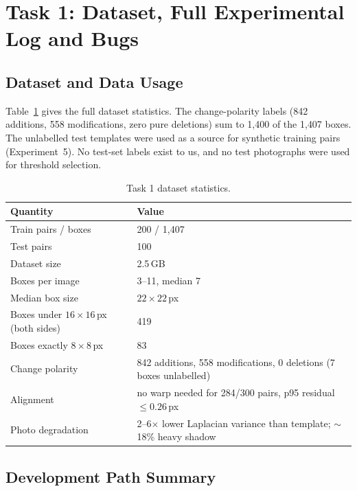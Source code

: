 \section{Task 1: Dataset, Full Experimental Log and Bugs}
\label{app:t1}
\renewcommand{\expprefix}{A}

\subsection{Dataset and Data Usage}

Table~\ref{tab:t1-dataset} gives the full dataset statistics. The change-polarity
labels (842 additions, 558 modifications, zero pure deletions) sum to 1{,}400 of the
1{,}407 boxes.
The unlabelled test templates were used as a source for synthetic training pairs
(Experiment~5). No test-set labels exist to us, and no test photographs were used for
threshold selection.

\begin{table}[h]
\caption{Task 1 dataset statistics.}\label{tab:t1-dataset}
\centering
\small
\begin{tabular}{lp{6.2cm}}
\toprule
Quantity & Value \\
\midrule
Train pairs / boxes & 200 / 1{,}407 \\
Test pairs & 100 \\
Dataset size & 2.5\,GB \\
Boxes per image & 3--11, median 7 \\
Median box size & $22\times22$\,px \\
Boxes under $16\times16$\,px (both sides) & 419 \\
Boxes exactly $8\times8$\,px & 83 \\
Change polarity & 842 additions, 558 modifications, 0 deletions (7 boxes unlabelled) \\
Alignment & no warp needed for 284/300 pairs, p95 residual $\leq0.26$\,px \\
Photo degradation & 2--6$\times$ lower Laplacian variance than template; $\sim$18\% heavy shadow \\
\bottomrule
\end{tabular}
\end{table}

\subsection{Development Path Summary}


